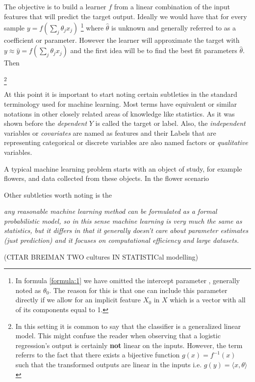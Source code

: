 The objective is to build a learner $f$ from a linear combination of the input features that will predict the target output. Ideally we would have that for every sample $y =  f\left(\sum_{j}\theta_jx_j\right)$ \label{formula:1} \footnote{In formula \ref{formula:1} we have omitted the intercept parameter , generally noted as $\theta_0$. The reason for this is that one can include this parameter directly if we allow for an implicit feature $X_0$ in $X$ which is a vector with all of its components equal to 1.  } where $\hat{\theta}$ is unknown and generally referred to as a coefficient or parameter. However the learner will approximate the target with $y \approx \hat{y} = f\left(\sum_{j}\theta_jx_j\right)$ and the first idea will be to find the best fit parameters $\hat{\theta}$. Then 

\footnote{In this setting it is common to say that the classifier is a generalized linear model. This might confuse the reader when observing that a logistic regression's output is certainly \textbf{not} linear on the inputs. However, the term referrs to the fact that there exists a bijective function $g(x) = f^{-1}(x)$ such that the transformed outputs are linear in the inputs i.e. $g(y) = \langle x, \theta \rangle$ }

At this point it is important to start noting certain subtleties in the standard terminology used for machine learning. Most terms have equivalent or similar notations in other closely related areas of knowledge like statistics. As it was shown before the \textit{dependent} $Y$ is called the target or label. Also, the \textit{independent} variables or \textit{covariates} are named as features and their 
Labels that are representing categorical or discrete variables are also named factors or \textit{qualitative} variables. 



A typical machine learning problem starts with an object of study, for example flowers, and data collected from these objects. In the flower scenario 

Other subtleties worth noting is the 

\textit{any reasonable machine learning method can be formulated as a formal probabilistic model, so in this sense machine learning is very much the same as statistics, but it differs in that it generally doesn't care about parameter estimates (just prediction) and it focuses on computational efficiency and large datasets.}

(CITAR BREIMAN \cite{breiman-statisticalmodeling} TWO cultures IN STATISTICal modelling)


